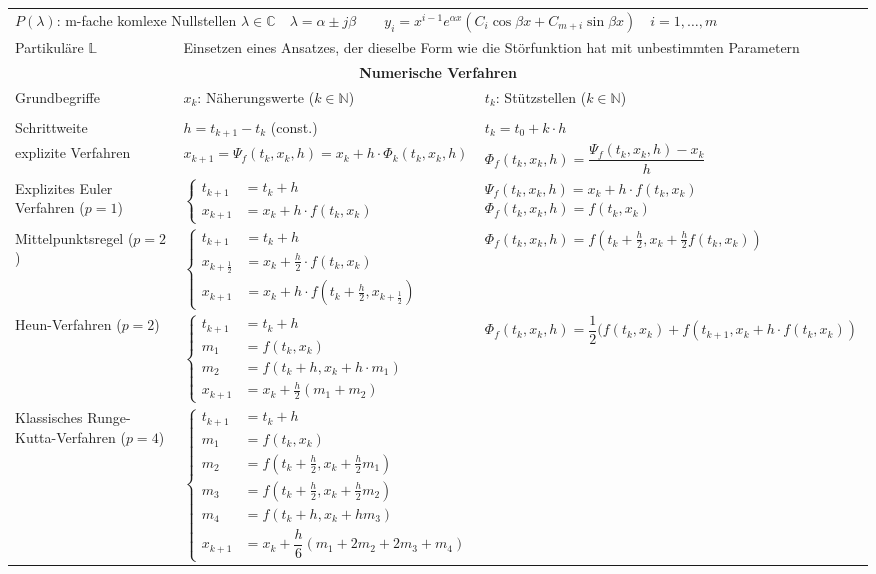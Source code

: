 \begin{tabularx}{\columnwidth}{p{2.8cm}XX}
	\multicolumn{3}{p{\columnwidth}}{$P(\lambda)$: m-fache komlexe Nullstellen $\lambda\in\mathbb{C} \quad \lambda = \alpha\pm j\beta \qquad y_i = x^{i-1}e^{\alpha x}(C_i\cos\beta x + C_{m+i}\sin\beta x) \quad  i=1, \dots,m$} \\
	Partikuläre $\mathbb{L}$& \multicolumn{2}{p{14cm}}{Einsetzen eines Ansatzes, der dieselbe Form wie die Störfunktion hat mit unbestimmten Parametern}\\
	\hline 
	\multicolumn{3}{c}{\textbf{Numerische Verfahren}}\\
	\hdashline 
	Grundbegriffe & $x_k$: Näherungswerte ($k\in \mathbb{N}$)& $t_k$: Stützstellen ($k\in \mathbb{N}$)\\
	\hdashline
	\multicolumn{3}{c}{Einschrittverfahren}\\
	Schrittweite & $h = t_{k+1} - t_k$ (const.) & $t_k = t_0 + k\cdot h$\\
	explizite Verfahren & $x_{k+1} = \Psi_f(t_k,x_k,h) = x_k + h\cdot \Phi_k(t_k,x_k,h)$& $\Phi_f(t_k,x_k,h) = \dfrac{\Psi_f(t_k,x_k,h) -x_k}{h}$\\
	\hdashline 
	Explizites Euler Verfahren ($p=1$) & $\begin{cases} t_{k+1} &= t_k+h \\ x_{k+1} &= x_k + h\cdot f(t_k,x_k)\end{cases}$ & 
	$\Psi_f(t_k,x_k,h) = x_k + h\cdot f(t_k,x_k)$ \newline 
	$\Phi_f (t_k,x_k,h) = f(t_k,x_k)$\\
	\hdashline 
	Mittelpunktsregel ($p=2$) & $\begin{cases} t_{k+1} &=t_k + h \\ x_{k+\frac{1}{2}} & = x_k + \frac{h}{2}\cdot f(t_k,x_k) \\ x_{k+1} &=x_k + h\cdot f(t_k+\frac{h}{2},x_{k+\frac{1}{2}})	\end{cases}$ & 
	$\Phi_f(t_k,x_k,h) = f\left(t_k + \frac{h}{2}, x_k + \frac{h}{2}f(t_k,x_k)\right)$\\
	\hdashline
	Heun-Verfahren ($p=2$) & $\begin{cases}t_{k+1} &= t_k+h\\ m_1 &= f(t_k,x_k) \\ m_2 & = f(t_k+h,x_k+h\cdot m_1)\\ x_{k+1} &= x_k +\frac{h}{2}(m_1+m_2)\end{cases}$ &
	$\Phi_f(t_k,x_k,h) = \dfrac{1}{2}(f(t_k,x_k) + f(t_{k+1},x_k +h\cdot f(t_k,x_k))$\\
	\hdashline 
	Klassisches Runge-Kutta-Verfahren ($p=4$)& 
	$\begin{cases}t_{k+1} &= t_k + h\\ m_1 &= f(t_k,x_k)\\ m_2 &=f(t_k +\frac{h}{2},x_k + \frac{h}{2}m_1)\\ m_3 &=f(t_k +\frac{h}{2},x_k + \frac{h}{2}m_2)\\ m_4 &=f(t_k +h,x_k + h m_3)\\ x_{k+1} &= x_k + \dfrac{h}{6}(m_1 + 2m_2 + 2m_3 + m_4)\end{cases}$ & 

\end{tabularx}
